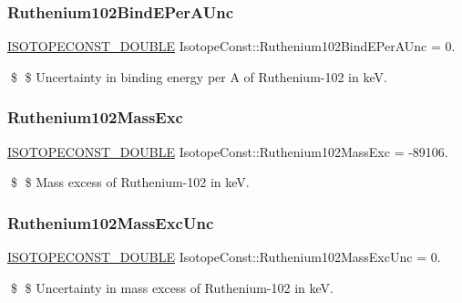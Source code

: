 \subsubsection{\texorpdfstring{Ruthenium102\+Bind\+E\+Per\+A\+Unc}{Ruthenium102BindEPerAUnc}}
{\footnotesize\ttfamily \mbox{\hyperlink{group___isotope_const-_macros_ga8f45a7272ce02c0b4c65c44636ed719a}{I\+S\+O\+T\+O\+P\+E\+C\+O\+N\+S\+T\+\_\+\+D\+O\+U\+B\+LE}} Isotope\+Const\+::\+Ruthenium102\+Bind\+E\+Per\+A\+Unc = 0.}

\$ \$ Uncertainty in binding energy per A of Ruthenium-\/102 in keV. \mbox{\label{group___isotope_const-_ruthenium-_ru102_ga0f06d86dfdeca8be69692e62b3ea4a72}} 
\subsubsection{\texorpdfstring{Ruthenium102\+Mass\+Exc}{Ruthenium102MassExc}}
{\footnotesize\ttfamily \mbox{\hyperlink{group___isotope_const-_macros_ga8f45a7272ce02c0b4c65c44636ed719a}{I\+S\+O\+T\+O\+P\+E\+C\+O\+N\+S\+T\+\_\+\+D\+O\+U\+B\+LE}} Isotope\+Const\+::\+Ruthenium102\+Mass\+Exc = -\/89106.}

\$ \$ Mass excess of Ruthenium-\/102 in keV. \mbox{\label{group___isotope_const-_ruthenium-_ru102_ga6ab87a10a09c14ce9509ca754381ff32}} 
\subsubsection{\texorpdfstring{Ruthenium102\+Mass\+Exc\+Unc}{Ruthenium102MassExcUnc}}
{\footnotesize\ttfamily \mbox{\hyperlink{group___isotope_const-_macros_ga8f45a7272ce02c0b4c65c44636ed719a}{I\+S\+O\+T\+O\+P\+E\+C\+O\+N\+S\+T\+\_\+\+D\+O\+U\+B\+LE}} Isotope\+Const\+::\+Ruthenium102\+Mass\+Exc\+Unc = 0.}

\$ \$ Uncertainty in mass excess of Ruthenium-\/102 in keV. \mbox{\label{group___isotope_const-_ruthenium-_ru102_ga49d29356adf15c22739d5d3728606df2}} 
